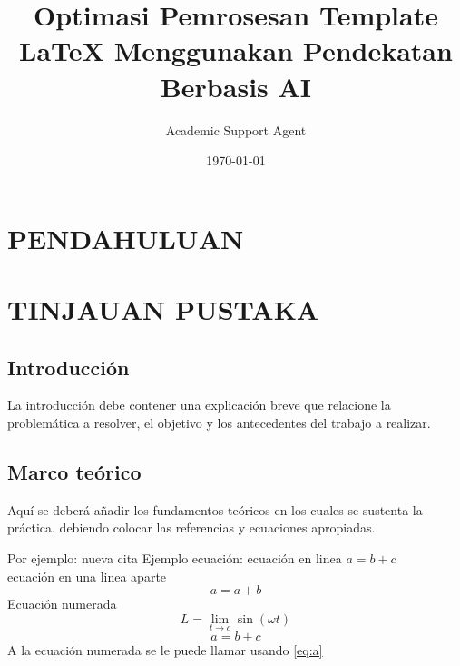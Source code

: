 \documentclass{reporte}
\title{Optimasi Pemrosesan Template LaTeX Menggunakan Pendekatan Berbasis AI}
\author{Academic Support Agent}
\date{\today}
\begin{document}
\maketitle

\begin{abstract}

\end{abstract}

\chapter{PENDAHULUAN}


\chapter{TINJAUAN PUSTAKA}


\usepackage[utf8]{inputenc}


\iniciadocumento
 
\section{Introducción}
La introducción debe contener una explicación breve que relacione la problemática a resolver, el objetivo y los antecedentes del trabajo a realizar.
\section{Marco teórico}
Aquí se deberá añadir los fundamentos teóricos en los cuales se sustenta la práctica. debiendo colocar las referencias y ecuaciones apropiadas. 

Por ejemplo: 
\cite{rashid} \cite{boylestad} \cite{rashidelectronica}\cite{boylestadE} nueva cita \cite{chapman}
\newline
Ejemplo ecuación:
ecuación en linea $a=b+c$ \\%
ecuación en una linea aparte $$a=a+b$$
Ecuación numerada
\begin{equation}
L=\lim_{t\to c}\sin (\omega t)
\label{eq:limite}
\end{equation}
\begin{equation}
a=b+c
\label{eq:a}
\end{equation}
A la ecuación numerada se le puede llamar usando \eqref{eq:a}
\end{document}
